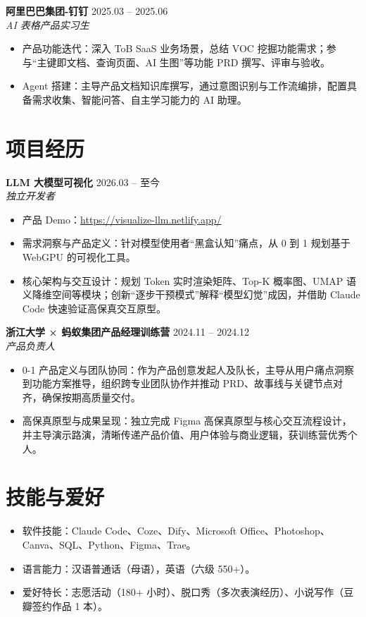\documentclass[11pt,a4paper]{article}
\newcommand{\entry}[4]{%
  \textbf{#1} \hfill #2\\
  \textit{#3} \hfill \textit{#4}\\
}
\begin{document}
\entry{阿里巴巴集团-钉钉}{2025.03 -- 2025.06}{AI 表格产品实习生}{}
\begin{itemize}
  \item 产品功能迭代：深入 ToB SaaS 业务场景，总结 VOC 挖掘功能需求；参与“主键即文档、查询页面、AI 生图”等功能 PRD 撰写、评审与验收。
  \item Agent 搭建：主导产品文档知识库撰写，通过意图识别与工作流编排，配置具备需求收集、智能问答、自主学习能力的 AI 助理。
\end{itemize}

\section*{项目经历}
\entry{LLM 大模型可视化}{2026.03 -- 至今}{独立开发者}{}
\begin{itemize}
  \item 产品 Demo：\url{https://visualize-llm.netlify.app/}
  \item 需求洞察与产品定义：针对模型使用者“黑盒认知”痛点，从 0 到 1 规划基于 WebGPU 的可视化工具。
  \item 核心架构与交互设计：规划 Token 实时渲染矩阵、Top-K 概率图、UMAP 语义降维空间等模块；创新“逐步干预模式”解释“模型幻觉”成因，并借助 Claude Code 快速验证高保真交互原型。
\end{itemize}

\entry{浙江大学 × 蚂蚁集团产品经理训练营}{2024.11 -- 2024.12}{产品负责人}{}
\begin{itemize}
  \item 0-1 产品定义与团队协同：作为产品创意发起人及队长，主导从用户痛点洞察到功能方案推导，组织跨专业团队协作并推动 PRD、故事线与关键节点对齐，确保按期高质量交付。
  \item 高保真原型与成果呈现：独立完成 Figma 高保真原型与核心交互流程设计，并主导演示路演，清晰传递产品价值、用户体验与商业逻辑，获训练营优秀个人。
\end{itemize}

\section*{技能与爱好}
\begin{itemize}
  \item 软件技能：Claude Code、Coze、Dify、Microsoft Office、Photoshop、Canva、SQL、Python、Figma、Trae。
  \item 语言能力：汉语普通话（母语），英语（六级 550+）。
  \item 爱好特长：志愿活动（180+ 小时）、脱口秀（多次表演经历）、小说写作（豆瓣签约作品 1 本）。
\end{itemize}
\end{document}
